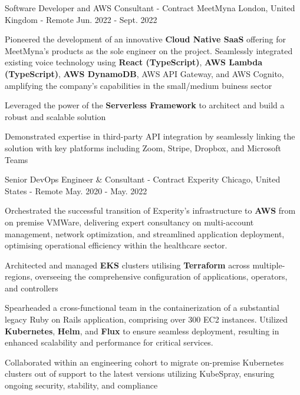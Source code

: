\begin{cventries}
  \cventry
    {Software Developer and AWS Consultant - Contract} %
    {MeetMyna} %
    {London, United Kingdom - Remote} %
    {Jun. 2022 - Sept. 2022} %
    {
      \begin{cvitems} %
        \item {Pioneered the development of an innovative \textbf{Cloud Native SaaS} offering for MeetMyna's products as the sole engineer on the project. Seamlessly integrated existing voice technology using \textbf{React (TypeScript)}, \textbf{AWS Lambda (TypeScript)}, \textbf{AWS DynamoDB}, AWS API Gateway, and AWS Cognito, amplifying the company's capabilities in the small/medium buiness sector}
        \item {Leveraged the power of the \textbf{Serverless Framework} to architect and build a robust and scalable solution}
        \item {Demonstrated expertise in third-party API integration by seamlessly linking the solution with key platforms including Zoom, Stripe, Dropbox, and Microsoft Teams}
      \end{cvitems}
    }

  \cventry
    {Senior DevOps Engineer \& Consultant - Contract} %
    {Experity} %
    {Chicago, United States - Remote} %
    {May. 2020 - May. 2022} %
    {
      \begin{cvitems} %
        \item {Orchestrated the successful transition of Experity's infrastructure to \textbf{AWS} from on premise VMWare, delivering expert consultancy on multi-account management, network optimization, and streamlined application deployment, optimising operational efficiency within the healthcare sector.}
        \item {Architected and managed \textbf{EKS} clusters utilising \textbf{Terraform} across multiple-regions, overseeing the comprehensive configuration of applications, operators, and controllers}
        \item {Spearheaded a cross-functional team in the containerization of a substantial legacy Ruby on Rails application, comprising over 300 EC2 instances. Utilized \textbf{Kubernetes}, \textbf{Helm}, and \textbf{Flux} to ensure seamless deployment, resulting in enhanced scalability and performance for critical services.}
        \item {Collaborated within an engineering cohort to migrate on-premise Kubernetes clusters out of support to the latest versions utilizing KubeSpray, ensuring ongoing security, stability, and compliance}
      \end{cvitems}
    }


\end{cventries}
